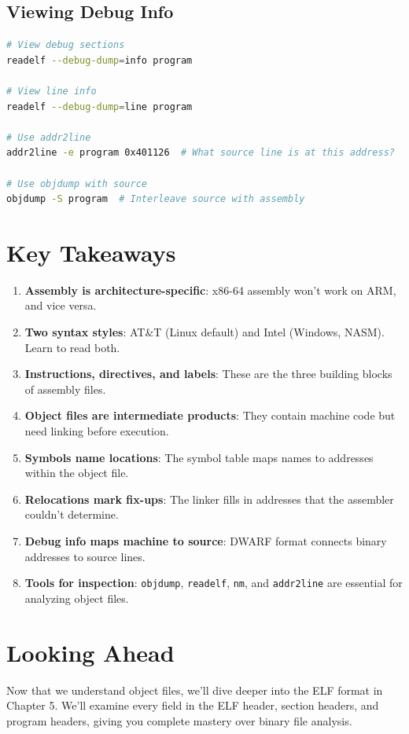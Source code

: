 \subsection{Viewing Debug Info}

\begin{lstlisting}[language=bash]
# View debug sections
readelf --debug-dump=info program

# View line info
readelf --debug-dump=line program

# Use addr2line
addr2line -e program 0x401126  # What source line is at this address?

# Use objdump with source
objdump -S program  # Interleave source with assembly
\end{lstlisting}

\section{Key Takeaways}

\begin{enumerate}
    \item \textbf{Assembly is architecture-specific}: x86-64 assembly won't work on ARM, and vice versa.
    \item \textbf{Two syntax styles}: AT\&T (Linux default) and Intel (Windows, NASM). Learn to read both.
    \item \textbf{Instructions, directives, and labels}: These are the three building blocks of assembly files.
    \item \textbf{Object files are intermediate products}: They contain machine code but need linking before execution.
    \item \textbf{Symbols name locations}: The symbol table maps names to addresses within the object file.
    \item \textbf{Relocations mark fix-ups}: The linker fills in addresses that the assembler couldn't determine.
    \item \textbf{Debug info maps machine to source}: DWARF format connects binary addresses to source lines.
    \item \textbf{Tools for inspection}: \texttt{objdump}, \texttt{readelf}, \texttt{nm}, and \texttt{addr2line} are essential for analyzing object files.
\end{enumerate}

\section{Looking Ahead}

Now that we understand object files, we'll dive deeper into the ELF format in Chapter 5. We'll examine every field in the ELF header, section headers, and program headers, giving you complete mastery over binary file analysis.
